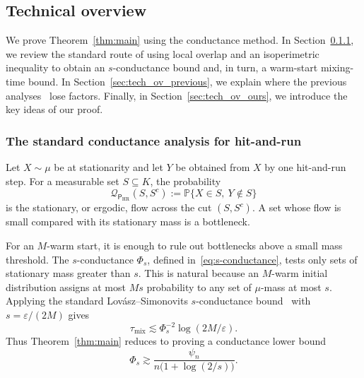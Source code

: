 \documentclass[11pt]{article}
\theoremstyle{definition}
\theoremstyle{remark}
\newcommand{\Prb}{\mathbb P}
\newcommand{\cQ}{\mathcal Q}
\newcommand{\mix}{\mathrm{mix}}
\newcommand{\HR}{\mathsf P_{\mathrm{HR}}}
\begin{document}
\subsection{Technical overview}\label{sec:technical-overview}
We prove Theorem~\ref{thm:main} using the conductance method. In Section~\ref{sec:tech_ov_standard}, we review the standard route of using local overlap and an isoperimetric inequality to obtain an $s$-conductance bound and, in turn, a warm-start mixing-time bound.  In Section~\ref{sec:tech_ov_previous}, we explain where the previous analyses~\cite{LV,CE} lose factors. Finally, in Section~\ref{sec:tech_ov_ours}, we introduce the key ideas of our proof.
\subsubsection{The standard conductance analysis for hit-and-run}\label{sec:tech_ov_standard}
Let $X\sim\mu$ be at stationarity and let $Y$ be obtained from $X$ by one hit-and-run step.  For a measurable set $S\subseteq K$, the probability
\[
 \cQ_{\HR}(S,S^c):=\Prb\{X\in S,\ Y\notin S\}
\]
is the stationary, or ergodic, flow across the cut $(S,S^c)$.  A set whose
flow is small compared with its stationary mass is a bottleneck.

For an $M$-warm start, it is enough to rule out bottlenecks above a small mass threshold.  The $s$-conductance $\Phi_s$, defined in~\eqref{eq:s-conductance}, tests only sets of stationary mass greater than $s$.  This is natural because an $M$-warm initial distribution assigns at most $Ms$ probability to any set of $\mu$-mass at most $s$.  Applying the standard Lov\'asz--Simonovits $s$-conductance bound~\cite{LS} with $s=\varepsilon/(2M)$ gives
\[
 \tau_{\mix}
 \lesssim
 \Phi_s^{-2}\log(2M/\varepsilon).
\]
Thus Theorem~\ref{thm:main} reduces to proving a conductance lower bound
\begin{equation}\label{eq:intro-conductance}
 \Phi_s
 \gtrsim
 \frac{\psi_n}
 {n\bigl(1+\log(2/s)\bigr)}.
\end{equation}
\end{document}
